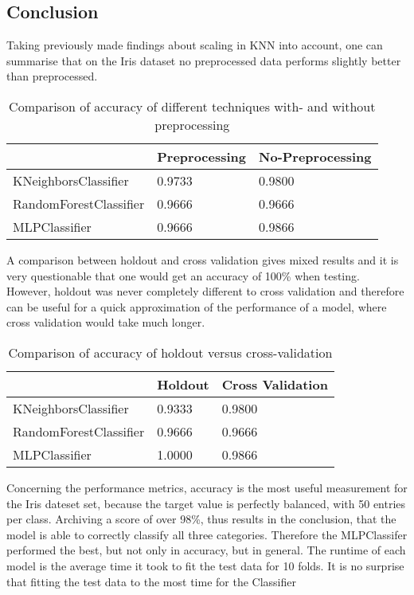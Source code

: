 \documentclass{article}
\begin{document}
\subsection{Conclusion}

Taking previously made findings about scaling in KNN into account, one can summarise that on the Iris dataset no preprocessed data performs slightly better than preprocessed.

\begin{table}[h]
\begin{center}
\begin{tabular}{|l|l|l|}
\hline
                       & Preprocessing & No-Preprocessing \\ \hline
KNeighborsClassifier   & 0.9733        & 0.9800           \\ \hline
RandomForestClassifier & 0.9666        & 0.9666           \\ \hline
MLPClassifier          & 0.9666        & 0.9866           \\ \hline
\end{tabular}
\caption{Comparison of accuracy of different techniques with- and without preprocessing}
\end{center}
\end{table}

A comparison between holdout and cross validation gives mixed results and it is very questionable that one would get an accuracy of 100\% when testing. However, holdout was never completely different to cross validation and therefore can be useful for a quick approximation of the performance of a model, where cross validation would take much longer.

\begin{table}[h]
\begin{center}
\begin{tabular}{|l|l|l|}
\hline
                       & Holdout & Cross Validation \\ \hline
KNeighborsClassifier   & 0.9333  & 0.9800           \\ \hline
RandomForestClassifier & 0.9666  & 0.9666           \\ \hline
MLPClassifier          & 1.0000  & 0.9866           \\ \hline
\end{tabular}
\caption{Comparison of accuracy of holdout versus cross-validation}
\end{center}
\end{table}

Concerning the performance metrics, accuracy is the most useful measurement for the Iris dateset set, because the target value is perfectly balanced, with 50 entries per class. Archiving a score of over 98\%, thus results in the conclusion, that the model is able to correctly classify all three categories. Therefore the MLPClassifer performed the best, but not only in accuracy, but in general. The runtime of each model is the average time it took to fit the test data for 10 folds. It is no surprise that fitting the test data to the most time for the Classifier
\end{document}

